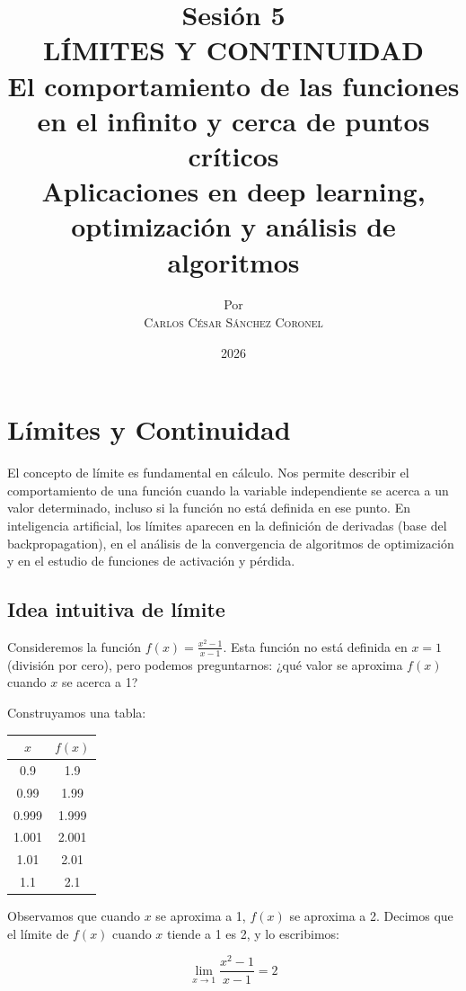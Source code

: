 \documentclass[12pt,a4paper,openany,oneside]{book}
\title{
    \textbf{Sesión 5} \\ 
    \Huge \textbf{LÍMITES Y CONTINUIDAD} \\
    \large El comportamiento de las funciones en el infinito y cerca de puntos críticos \\
    \normalsize Aplicaciones en deep learning, optimización y análisis de algoritmos
}
\author{
    \small Por \\ \vspace{0.2cm}
    \Large \textsc{Carlos César Sánchez Coronel}
}
\date{2026}
\begin{document}
\maketitle
\tableofcontents
{}

\chapter{Límites y Continuidad}

El concepto de límite es fundamental en cálculo. Nos permite describir el comportamiento de una función cuando la variable independiente se acerca a un valor determinado, incluso si la función no está definida en ese punto. En inteligencia artificial, los límites aparecen en la definición de derivadas (base del backpropagation), en el análisis de la convergencia de algoritmos de optimización y en el estudio de funciones de activación y pérdida.

\section{Idea intuitiva de límite}

Consideremos la función $f(x) = \frac{x^2 - 1}{x - 1}$. Esta función no está definida en $x = 1$ (división por cero), pero podemos preguntarnos: ¿qué valor se aproxima $f(x)$ cuando $x$ se acerca a 1?

Construyamos una tabla:

\begin{center}
\begin{tabular}{c|c}
$x$ & $f(x)$ \\
\hline
0.9 & 1.9 \\
0.99 & 1.99 \\
0.999 & 1.999 \\
1.001 & 2.001 \\
1.01 & 2.01 \\
1.1 & 2.1 \\
\end{tabular}
\end{center}

Observamos que cuando $x$ se aproxima a 1, $f(x)$ se aproxima a 2. Decimos que el límite de $f(x)$ cuando $x$ tiende a 1 es 2, y lo escribimos:

\[
\lim_{x \to 1} \frac{x^2 - 1}{x - 1} = 2
\]
\end{document}
